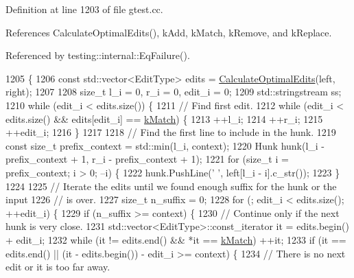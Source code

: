 Definition at line 1203 of file gtest.\+cc.



References Calculate\+Optimal\+Edits(), k\+Add, k\+Match, k\+Remove, and k\+Replace.



Referenced by testing\+::internal\+::\+Eq\+Failure().


\begin{DoxyCode}
1205                                               \{
1206   \textcolor{keyword}{const} std::vector<EditType> edits = \hyperlink{namespacetesting_1_1internal_1_1edit__distance_a26323b4c2a29ea8e187aafbd4d2275db}{CalculateOptimalEdits}(left, right);
1207 
1208   \textcolor{keywordtype}{size\_t} l\_i = 0, r\_i = 0, edit\_i = 0;
1209   std::stringstream ss;
1210   \textcolor{keywordflow}{while} (edit\_i < edits.size()) \{
1211     \textcolor{comment}{// Find first edit.}
1212     \textcolor{keywordflow}{while} (edit\_i < edits.size() && edits[edit\_i] == \hyperlink{namespacetesting_1_1internal_1_1edit__distance_ad46aa6da12aec1a3f166310478b53a08a7bdb9c74613a94f21b7489e0b5640a63}{kMatch}) \{
1213       ++l\_i;
1214       ++r\_i;
1215       ++edit\_i;
1216     \}
1217 
1218     \textcolor{comment}{// Find the first line to include in the hunk.}
1219     \textcolor{keyword}{const} \textcolor{keywordtype}{size\_t} prefix\_context = std::min(l\_i, context);
1220     Hunk hunk(l\_i - prefix\_context + 1, r\_i - prefix\_context + 1);
1221     \textcolor{keywordflow}{for} (\textcolor{keywordtype}{size\_t} i = prefix\_context; i > 0; --i) \{
1222       hunk.PushLine(\textcolor{charliteral}{' '}, left[l\_i - i].c\_str());
1223     \}
1224 
1225     \textcolor{comment}{// Iterate the edits until we found enough suffix for the hunk or the input}
1226     \textcolor{comment}{// is over.}
1227     \textcolor{keywordtype}{size\_t} n\_suffix = 0;
1228     \textcolor{keywordflow}{for} (; edit\_i < edits.size(); ++edit\_i) \{
1229       \textcolor{keywordflow}{if} (n\_suffix >= context) \{
1230         \textcolor{comment}{// Continue only if the next hunk is very close.}
1231         std::vector<EditType>::const\_iterator it = edits.begin() + edit\_i;
1232         \textcolor{keywordflow}{while} (it != edits.end() && *it == \hyperlink{namespacetesting_1_1internal_1_1edit__distance_ad46aa6da12aec1a3f166310478b53a08a7bdb9c74613a94f21b7489e0b5640a63}{kMatch}) ++it;
1233         \textcolor{keywordflow}{if} (it == edits.end() || (it - edits.begin()) - edit\_i >= context) \{
1234           \textcolor{comment}{// There is no next edit or it is too far away.}

\end{DoxyCode}
